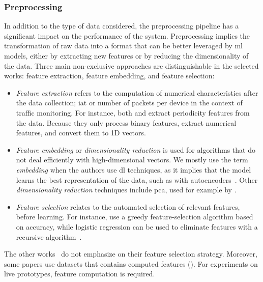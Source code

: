 \subsubsection{Preprocessing\label{sec:sota.quali.preprocess}}

In addition to the type of data considered, the preprocessing pipeline has a significant impact on the performance of the system.
Preprocessing implies the transformation of raw data into a format that can be better leveraged by \gls{ml} models, either by extracting new features or by reducing the dimensionality of the data.
Three main non-exclusive approaches are distinguishable in the selected works: feature extraction, feature embedding, and feature selection:
\begin{itemize}
  \item \emph{Feature extraction} refers to the computation of numerical characteristics after the data collection; \eg \gls{iat} or number of packets per device in the context of traffic monitoring.
  For instance, both \textcite{nguyen_DIoTFederatedSelflearning_2019} and \textcite{pahl_AllEyesYou_2018} extract periodicity features from the data.
  Because they only process binary features, \textcite{qin_LineSpeedScalableIntrusion_2020a} extract numerical features, and convert them to 1D vectors.
  
  \item \emph{Feature embedding} or \emph{dimensionality reduction} is used for algorithms that do not deal efficiently with high-dimensional vectors.
  We mostly use the term \emph{embedding} when the authors use \gls{dl} techniques, as it implies that the model learns the best representation of the data, such as with autoencoders~\cite{chen_Networkanomalydetection_2020}.
  Other \emph{dimensionality reduction} techniques include \gls{pca}, used for example by \textcite{kim_CollaborativeAnomalyDetection_2020}.

  \item \emph{Feature selection} relates to the automated selection of relevant features, before learning.
  For instance, \textcite{qin_FederatedLearningBasedNetwork_2021} use a greedy feature-selection algorithm based on accuracy, while logistic regression can be used to eliminate features with a recursive algorithm~\cite{al-athbaal-marri_FederatedMimicLearning_2020}.
\end{itemize}

The other works~\cite{zhang_BlockchainbasedFederatedLearning_2020,schneble_Attackdetectionusing_2019,li_DeepFedFederatedDeep_2020,rathore_BlockSecIoTNetBlockchainbaseddecentralized_2019} do not emphasize on their feature selection strategy.
Moreover, some papers \cite{li_DeepFedFederatedDeep_2020,schneble_Attackdetectionusing_2019,zhao_MultiTaskNetworkAnomaly_2019} use datasets that contains computed features ().
For experiments on live prototypes, feature computation is required.

